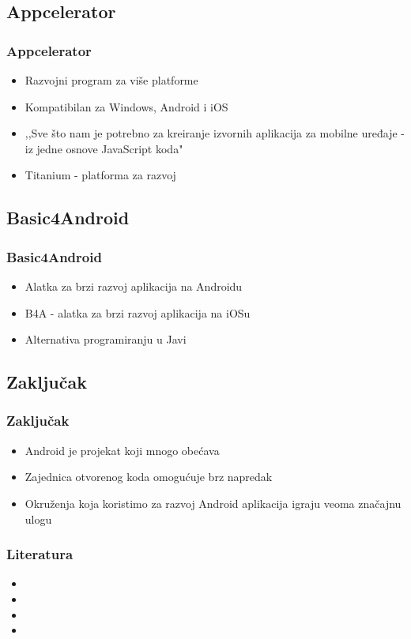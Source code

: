 \documentclass{beamer}
\begin{document}
\begin{frame}
    \section{Appcelerator}
    \frametitle{Appcelerator} 
    \begin{itemize}
    	\item Razvojni program za više platforme
	\item Kompatibilan za Windows, Android i iOS
	\item ,,Sve što nam je potrebno za kreiranje izvornih aplikacija za mobilne uređaje - iz jedne osnove JavaScript koda"
	\item  Titanium - platforma za razvoj
   \end{itemize}
\end{frame}

\begin{frame}
    \section{Basic4Android}
    \frametitle{Basic4Android} 
    \begin{itemize}
	\item Alatka za brzi razvoj aplikacija na Androidu
	\item B4A - alatka za brzi razvoj aplikacija na iOSu
	\item Alternativa programiranju u Javi
   \end{itemize}
\end{frame}

\begin{frame}
    \section{Zaključak}
    \frametitle{Zaključak} 
    \begin{itemize}
	\item Android je projekat koji mnogo obećava
	\item Zajednica otvorenog koda omogućuje brz napredak
	\item Okruženja koja koristimo za razvoj Android aplikacija igraju veoma značajnu ulogu
	
   \end{itemize}
\end{frame}

\begin{frame}
    \frametitle{Literatura}
    \begin{itemize}
	\item
	\item 
	\item 
	\item  
   \end{itemize}
\end{frame}
\end{document}
